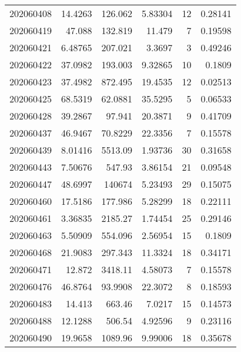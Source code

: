 \begin{tabular}{rrrrrr}
 202060408 &         14.4263  &      126.062  &            5.83304 &          12 & 0.28141 \\
 202060419 &         47.088   &      132.819  &           11.479   &           7 & 0.19598 \\
 202060421 &          6.48765 &      207.021  &            3.3697  &           3 & 0.49246 \\
 202060422 &         37.0982  &      193.003  &            9.32865 &          10 & 0.1809  \\
 202060423 &         37.4982  &      872.495  &           19.4535  &          12 & 0.02513 \\
 202060425 &         68.5319  &       62.0881 &           35.5295  &           5 & 0.06533 \\
 202060428 &         39.2867  &       97.941  &           20.3871  &           9 & 0.41709 \\
 202060437 &         46.9467  &       70.8229 &           22.3356  &           7 & 0.15578 \\
 202060439 &          8.01416 &     5513.09   &            1.93736 &          30 & 0.31658 \\
 202060443 &          7.50676 &      547.93   &            3.86154 &          21 & 0.09548 \\
 202060447 &         48.6997  &   140674      &            5.23493 &          29 & 0.15075 \\
 202060460 &         17.5186  &      177.986  &            5.28299 &          18 & 0.22111 \\
 202060461 &          3.36835 &     2185.27   &            1.74454 &          25 & 0.29146 \\
 202060463 &          5.50909 &      554.096  &            2.56954 &          15 & 0.1809  \\
 202060468 &         21.9083  &      297.343  &           11.3324  &          18 & 0.34171 \\
 202060471 &         12.872   &     3418.11   &            4.58073 &           7 & 0.15578 \\
 202060476 &         46.8764  &       93.9908 &           22.3072  &           8 & 0.18593 \\
 202060483 &         14.413   &      663.46   &            7.0217  &          15 & 0.14573 \\
 202060488 &         12.1288  &      506.54   &            4.92596 &           9 & 0.23116 \\
 202060490 &         19.9658  &     1089.96   &            9.99006 &          18 & 0.35678 \\

\end{tabular}
